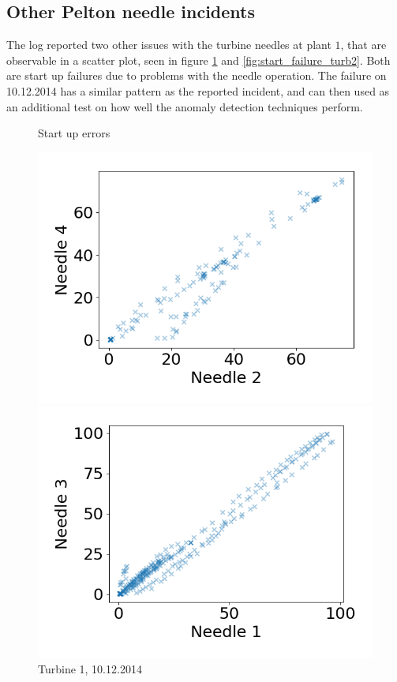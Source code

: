     \subsection{Other Pelton needle incidents}
        The log reported two other issues with the turbine needles at plant $1$, that are observable in a scatter plot, seen in figure \ref{fig:start_failure_turb1} and \ref{fig:start_failure_turb2}. Both are start up failures due to problems with the needle operation. The failure on 10.12.2014 has a similar pattern as the reported incident, and can then used as an additional test on how well the anomaly detection techniques perform.
        \begin{figure}[h!]
            \caption*{Start up errors}
            \begin{minipage}[b]{0.5\linewidth}
                \centering
                \includegraphics[width = \textwidth]{report/figures/data/turb1_n2_n4_scatter_start_failure_10122014.png}
                \caption{Turbine 1, 10.12.2014}
                \label{fig:start_failure_turb1}
            \end{minipage}
            \begin{minipage}[b]{0.5\linewidth}
                \centering
                \includegraphics[width = \textwidth]{report/figures/data/turb2_n1_n3_start_failure_25082016.png}

\end{minipage}
\end{figure}
